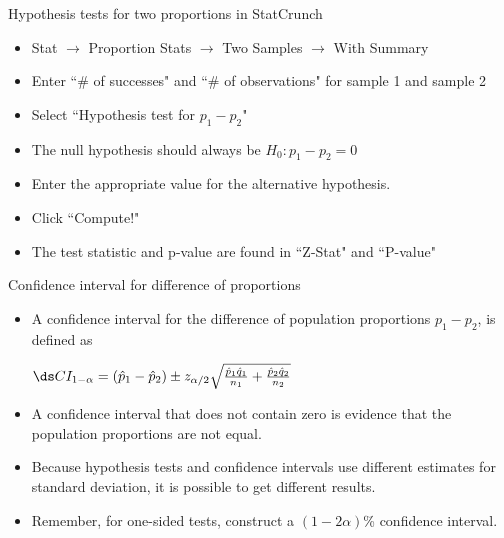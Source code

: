 \documentclass[xcolor=table]{beamer}
\begin{document}
\begin{frame}{Hypothesis tests for two proportions in StatCrunch}

\begin{block}{}
\begin{itemize}
\large
\item Stat $\to$ Proportion Stats $\to$ Two Samples $\to$ With Summary
\item Enter ``\# of successes" and ``\# of observations" for sample 1 and sample 2
\item Select ``Hypothesis test for $p_1 - p_2$"
\item The null hypothesis should always be $H_0: p_1 - p_2 = 0$
\item Enter the appropriate value for the alternative hypothesis.
\item Click ``Compute!"
\item The test statistic and p-value are found in ``Z-Stat" and ``P-value"
\end{itemize}
\end{block}

\end{frame}

\begin{frame}{Confidence interval for difference of proportions}
\begin{block}{}
\large
\begin{itemize}
\item A confidence interval for the difference of population proportions $p_1 - p_2$, is defined as\\
\smallskip
{\centering $\ds CI_{1-\alpha} = (\hat p_1 - \hat p_2) \pm z_{\alpha/2} \sqrt{\frac {\hat p_1 \hat q_1}{n_1} + \frac {\hat p_2 \hat q_2}{n_2}}$ \par}
\smallskip
\pause\item A confidence interval that does not contain zero is evidence that the population proportions are not equal.

\pause\item Because hypothesis tests and confidence intervals use different estimates for standard deviation, it is possible to get different results.

\pause\item Remember, for one-sided tests, construct a $(1-2\alpha)$\% confidence interval.
\end{itemize}
\end{block}
\end{frame}
\end{document}
